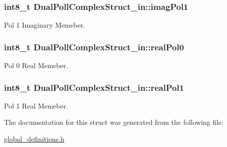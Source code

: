\subsubsection[{\texorpdfstring{imag\+Pol1}{imagPol1}}]{\setlength{\rightskip}{0pt plus 5cm}int8\+\_\+t Dual\+Poll\+Complex\+Struct\+\_\+in\+::imag\+Pol1}\hypertarget{struct_dual_poll_complex_struct__in_aa76ee741eabd163bd5c4a9356e6e7fc5}{}\label{struct_dual_poll_complex_struct__in_aa76ee741eabd163bd5c4a9356e6e7fc5}
Pol 1 Imaginary Memeber. 
\subsubsection[{\texorpdfstring{real\+Pol0}{realPol0}}]{\setlength{\rightskip}{0pt plus 5cm}int8\+\_\+t Dual\+Poll\+Complex\+Struct\+\_\+in\+::real\+Pol0}\hypertarget{struct_dual_poll_complex_struct__in_a34f0b4c44324ee8f9d48317dd1c3649f}{}\label{struct_dual_poll_complex_struct__in_a34f0b4c44324ee8f9d48317dd1c3649f}
Pol 0 Real Memeber. 
\subsubsection[{\texorpdfstring{real\+Pol1}{realPol1}}]{\setlength{\rightskip}{0pt plus 5cm}int8\+\_\+t Dual\+Poll\+Complex\+Struct\+\_\+in\+::real\+Pol1}\hypertarget{struct_dual_poll_complex_struct__in_a748ba48cc32cc2c47e0a1826b0de3cc3}{}\label{struct_dual_poll_complex_struct__in_a748ba48cc32cc2c47e0a1826b0de3cc3}
Pol 1 Real Memeber. 

The documentation for this struct was generated from the following file\+:\begin{DoxyCompactItemize}
\item 
\hyperlink{global__definitions_8h}{global\+\_\+definitions.\+h}\end{DoxyCompactItemize}

